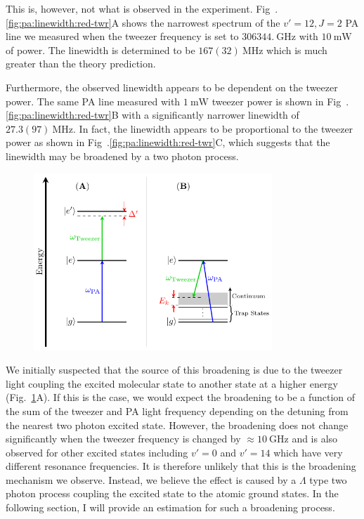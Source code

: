 This is, however, not what is observed in the experiment.
Fig~.\ref{fig:pa:linewidth:red-twr}A shows the narrowest spectrum of the $v'=12, J=2$ PA line
we measured when the tweezer frequency is set to $306344.~\mathrm{GHz}$
with $10~\mathrm{mW}$ of power. The linewidth is determined to be $167(32)~\mathrm{MHz}$
which is much greater than the theory prediction.

Furthermore, the observed linewidth appears to be dependent on the tweezer power.
The same PA line measured with $1~\mathrm{mW}$ tweezer power
is shown in Fig~.\ref{fig:pa:linewidth:red-twr}B with a significantly narrower linewidth
of $27.3(97)~\mathrm{MHz}$.
In fact, the linewidth appears to be proportional to the tweezer power
as shown in Fig~.\ref{fig:pa:linewidth:red-twr}C,
which suggests that the linewidth may be broadened by a two photon process.

\begin{figure}
  \centering
  \includegraphics[width=0.8\textwidth]{figures/pa_two_photon_up_vs_down.pdf}
  \caption[Two photon broadening mechanism for PA.]{
    \todo{}
    \label{fig:pa:linewidth:up-vs-down}}
\end{figure}

We initially suspected that the source of this broadening is due to the tweezer light
coupling the excited molecular state to another state at a higher energy
(Fig.~\ref{fig:pa:linewidth:up-vs-down}A).
If this is the case, we would expect the broadening to be a function of
the sum of the tweezer and PA light frequency depending on the detuning from the nearest
two photon excited state.
However, the broadening does not change significantly when the tweezer frequency
is changed by $\approx10~\mathrm{GHz}$ and
is also observed for other excited states including $v'=0$ and $v'=14$
which have very different resonance frequencies.
It is therefore unlikely that this is the broadening mechanism we observe.
Instead, we believe the effect is caused by a $\Lambda$ type two photon process
coupling the excited state to the atomic ground states.
In the following section, I will provide an estimation for such a broadening process.

